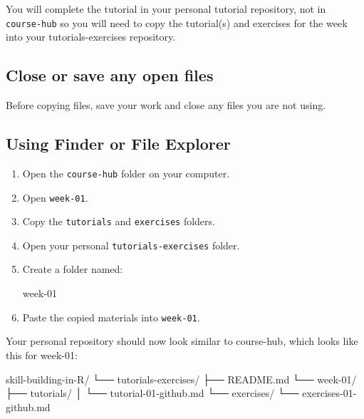\documentclass[
  letterpaper,
  DIV=11,
  numbers=noendperiod]{scrartcl}
\newenvironment{Shaded}{\begin{snugshade}}{\end{snugshade}}
\newcommand{\NormalTok}[1]{\textcolor[rgb]{0.00,0.23,0.31}{#1}}
\begin{document}
You will complete the tutorial in your personal tutorial repository, not
in \texttt{course-hub} so you will need to copy the tutorial(s) and
exercises for the week into your tutorials-exercises repository.

\subsection{Close or save any open
files}\label{close-or-save-any-open-files}

Before copying files, save your work and close any files you are not
using.

\subsection{Using Finder or File
Explorer}\label{using-finder-or-file-explorer}

\begin{enumerate}
\def\labelenumi{\arabic{enumi}.}
\item
  Open the \texttt{course-hub} folder on your computer.
\item
  Open \texttt{week-01}.
\item
  Copy the \texttt{tutorials} and \texttt{exercises} folders.
\item
  Open your personal \texttt{tutorials-exercises} folder.
\item
  Create a folder named:

\begin{Shaded}
\begin{Highlighting}[]
\NormalTok{week{-}01}
\end{Highlighting}
\end{Shaded}
\item
  Paste the copied materials into \texttt{week-01}.
\end{enumerate}

Your personal repository should now look similar to course-hub, which
looks like this for week-01:

\begin{Shaded}
\begin{Highlighting}[]
\NormalTok{skill{-}building{-}in{-}R/}
\NormalTok{└── tutorials{-}exercises/}
\NormalTok{    ├── README.md}
\NormalTok{    └── week{-}01/}
\NormalTok{        ├── tutorials/}
\NormalTok{        │   └── tutorial{-}01{-}github.md}
\NormalTok{        └── exercises/}
\NormalTok{            └── exercises{-}01{-}github.md}
\end{Highlighting}
\end{Shaded}
\end{document}
